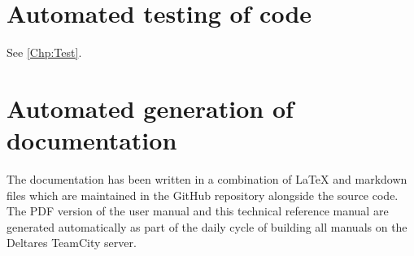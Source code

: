 \section{Automated testing of code}

See \autoref{Chp:Test}.

\section{Automated generation of documentation}

The documentation has been written in a combination of LaTeX and markdown files which are maintained in the GitHub repository alongside the source code.
The PDF version of the user manual and this technical reference manual are generated automatically as part of the daily cycle of building all manuals on the Deltares TeamCity server.
